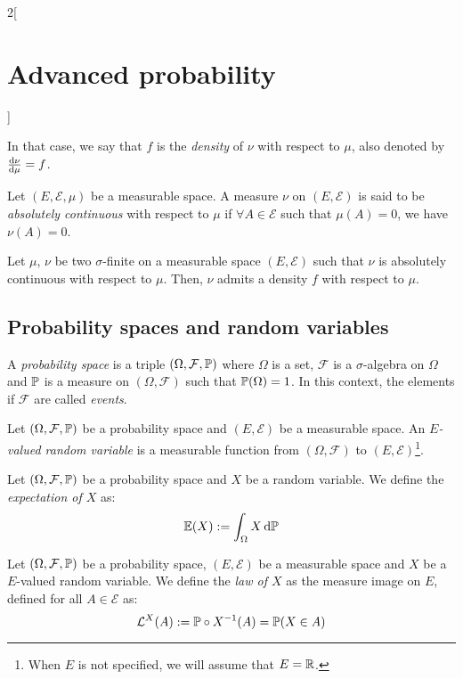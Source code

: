\documentclass[../../../main_math.tex]{subfiles}
\begin{document}
\begin{multicols}{2}[\section{Advanced probability}]
\begin{definition}
    In that case, we say that $f$ is the \emph{density} of $\nu$ with respect to $\mu$, also denoted by $\dv{\nu}{\mu}=f$.
  \end{definition}
  \begin{definition}
    Let $(E,\mathcal{E},\mu)$ be a measurable space. A measure $\nu$ on $(E,\mathcal{E})$ is said to be \emph{absolutely continuous} with respect to $\mu$ if $\forall A\in\mathcal{E}$ such that $\mu(A)=0$, we have $\nu(A)=0$.
  \end{definition}
  \begin{theorem}
    Let $\mu$, $\nu$ be two $\sigma$-finite on  a measurable space $(E,\mathcal{E})$ such that $\nu$ is absolutely continuous with respect to $\mu$. Then, $\nu$ admits a density $f$ with respect to $\mu$.
  \end{theorem}
  \subsection{Probability spaces and random variables}
  \begin{definition}
    A \emph{probability space} is a triple $(\Omega,\mathcal{F},\mathbb{P})$ where $\Omega$ is a set, $\mathcal{F}$ is a $\sigma$-algebra on $\Omega$ and $\mathbb{P}$ is a measure on $(\Omega,\mathcal{F})$ such that $\mathbb{P}(\Omega)=1$. In this context, the elements if $\mathcal{F}$ are called \emph{events}.
  \end{definition}
  \begin{definition}
    Let $(\Omega,\mathcal{F},\mathbb{P})$ be a probability space and $(E,\mathcal{E})$ be a measurable space. An \emph{$E$-valued random variable} is a measurable function from $(\Omega,\mathcal{F})$ to $(E,\mathcal{E})$\footnote{When $E$ is not specified, we will assume that $E=\mathbb{R}$.}.
  \end{definition}
  \begin{definition}[Expectation]
    Let $(\Omega,\mathcal{F},\mathbb{P})$ be a probability space and $X$ be a random variable. We define the \emph{expectation of $X$} as:
    $$
      \mathbb{E}(X):=\int_\Omega{X\dd{\ensuremath{\mathbb{P}}}}
    $$
  \end{definition}
  \begin{definition}
    Let $(\Omega,\mathcal{F},\mathbb{P})$ be a probability space, $(E,\mathcal{E})$ be a measurable space and $X$ be a $E$-valued random variable. We define the \emph{law of $X$} as the measure image on $E$, defined for all $A\in\mathcal{E}$ as:
    $$
      \mathcal{L}^X(A):=\mathbb{P}\circ X^{-1}(A)=\mathbb{P}(X\in A)
$$
\end{definition}
\end{multicols}
\end{document}
